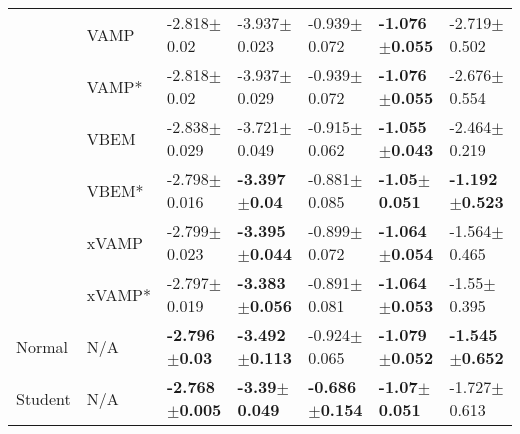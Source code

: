 \begin{tabular}{lllllll}
        & VAMP &            -2.818$\pm$0.02 &           -3.937$\pm$0.023 &           -0.939$\pm$0.072 &  \textbf{-1.076$\pm$0.055} &           -2.719$\pm$0.502 \\
        & VAMP* &            -2.818$\pm$0.02 &           -3.937$\pm$0.029 &           -0.939$\pm$0.072 &  \textbf{-1.076$\pm$0.055} &           -2.676$\pm$0.554 \\
        & VBEM &           -2.838$\pm$0.029 &           -3.721$\pm$0.049 &           -0.915$\pm$0.062 &  \textbf{-1.055$\pm$0.043} &           -2.464$\pm$0.219 \\
        & VBEM* &           -2.798$\pm$0.016 &   \textbf{-3.397$\pm$0.04} &           -0.881$\pm$0.085 &   \textbf{-1.05$\pm$0.051} &  \textbf{-1.192$\pm$0.523} \\
        & xVAMP &           -2.799$\pm$0.023 &  \textbf{-3.395$\pm$0.044} &           -0.899$\pm$0.072 &  \textbf{-1.064$\pm$0.054} &           -1.564$\pm$0.465 \\
        & xVAMP* &           -2.797$\pm$0.019 &  \textbf{-3.383$\pm$0.056} &           -0.891$\pm$0.081 &  \textbf{-1.064$\pm$0.053} &            -1.55$\pm$0.395 \\
Normal & N/A &   \textbf{-2.796$\pm$0.03} &  \textbf{-3.492$\pm$0.113} &           -0.924$\pm$0.065 &  \textbf{-1.079$\pm$0.052} &  \textbf{-1.545$\pm$0.652} \\
Student & N/A &  \textbf{-2.768$\pm$0.005} &   \textbf{-3.39$\pm$0.049} &  \textbf{-0.686$\pm$0.154} &   \textbf{-1.07$\pm$0.051} &           -1.727$\pm$0.613 \\
\bottomrule
\end{tabular}

